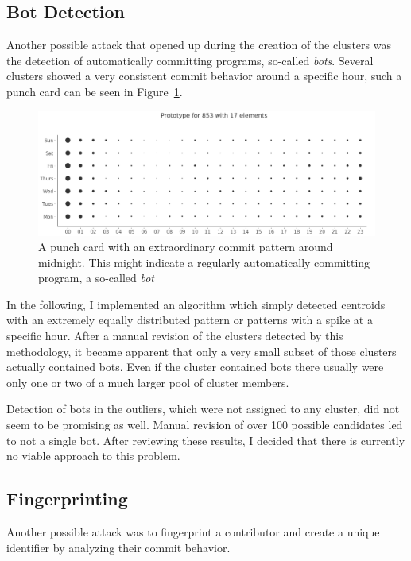 

\subsection{Bot Detection}
Another possible attack that opened up during the creation of the clusters was the detection of automatically committing programs, so-called \emph{bots}.
Several clusters showed a very consistent commit behavior around a specific hour, such a punch card can be seen in Figure~\ref{fig:bot-punchcard}.

\begin{figure}[H]
    \includegraphics[scale=0.32]{./graphs/analysis/bot-punchcard}
    \centering
    \caption{A punch card with an extraordinary commit pattern around midnight. This might indicate a regularly automatically committing program, a so-called \emph{bot}}\label{fig:bot-punchcard}
\end{figure}

In the following, I implemented an algorithm which simply detected centroids with an extremely equally distributed pattern or patterns with a spike at a specific hour.
After a manual revision of the clusters detected by this methodology, it became apparent that only a very small subset of those clusters actually contained bots.
Even if the cluster contained bots there usually were only one or two of a much larger pool of cluster members.

Detection of bots in the outliers, which were not assigned to any cluster, did not seem to be promising as well.
Manual revision of over 100 possible candidates led to not a single bot.
After reviewing these results, I decided that there is currently no viable approach to this problem.


\subsection{Fingerprinting}
Another possible attack was to fingerprint a contributor and create a unique identifier by analyzing their commit behavior.

